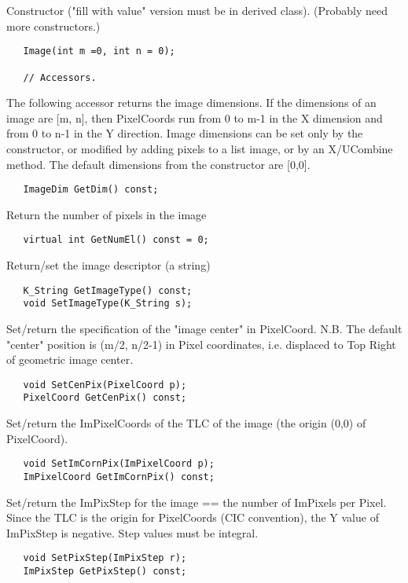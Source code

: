       Constructor ("fill with value" version must be in derived class).
      (Probably need more constructors.)
\begin{verbatim}
   Image(int m =0, int n = 0);

   // Accessors.
\end{verbatim}
      The following accessor returns the image dimensions. If the
      dimensions of an image are [m, n], then PixelCoords run from 0 to m-1
      in the X dimension and from 0 to n-1 in the Y direction. Image
      dimensions can be set only by the constructor, or modified by adding
      pixels to a list image, or by an X/UCombine method. The default
      dimensions from the constructor are [0,0].
\begin{verbatim}
   ImageDim GetDim() const;

\end{verbatim}

      Return the number of pixels in the image
\begin{verbatim}
   virtual int GetNumEl() const = 0;

\end{verbatim}

      Return/set the image descriptor (a string)
\begin{verbatim}
   K_String GetImageType() const;
   void SetImageType(K_String s);

\end{verbatim}

      Set/return the specification of the "image center" in PixelCoord.
      N.B. The default "center" position is (m/2, n/2-1) in Pixel
      coordinates, i.e. displaced to Top Right of geometric image
      center.
\begin{verbatim}
   void SetCenPix(PixelCoord p);
   PixelCoord GetCenPix() const;

\end{verbatim}

      Set/return the ImPixelCoords of the TLC of the image (the origin
      (0,0) of PixelCoord).
\begin{verbatim}
   void SetImCornPix(ImPixelCoord p);
   ImPixelCoord GetImCornPix() const;

\end{verbatim}

      Set/return the ImPixStep for the image == the number of ImPixels
      per Pixel. Since the TLC is the origin for PixelCoords (CIC
      convention), the Y value of ImPixStep is negative. Step values
      must be integral.
\begin{verbatim}
   void SetPixStep(ImPixStep r);
   ImPixStep GetPixStep() const;

\end{verbatim}

